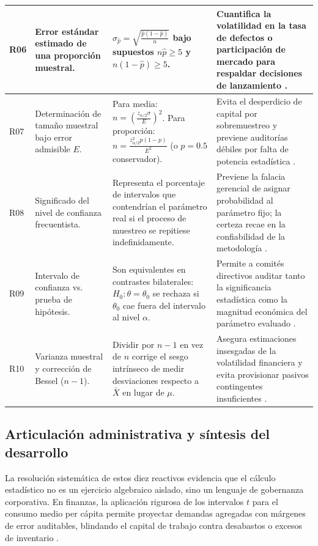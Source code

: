 {\begin{center}
\begin{longtable}{p{1.1cm}p{4.2cm}p{4.3cm}p{4.8cm}}
\midrule
R06 & Error estándar estimado de una proporción muestral. & $\sigma_{\hat{p}} = \sqrt{\frac{\hat{p}(1-\hat{p})}{n}}$ bajo supuestos $n\hat{p} \ge 5$ y $n(1-\hat{p}) \ge 5$. & Cuantifica la volatilidad en la tasa de defectos o participación de mercado para respaldar decisiones de lanzamiento \citep{anderson2012}. \\
\midrule
R07 & Determinación de tamaño muestral bajo error admisible $E$. & Para media: $n = \left(\frac{z_{\alpha/2}\sigma}{E}\right)^2$. Para proporción: $n = \frac{z_{\alpha/2}^2 p(1-p)}{E^2}$ (o $p=0.5$ conservador). & Evita el desperdicio de capital por sobremuestreo y previene auditorías débiles por falta de potencia estadística \citep{lind2012}. \\
\midrule
R08 & Significado del nivel de confianza frecuentista. & Representa el porcentaje de intervalos que contendrían el parámetro real si el proceso de muestreo se repitiese indefinidamente. & Previene la falacia gerencial de asignar probabilidad al parámetro fijo; la certeza recae en la confiabilidad de la metodología \citep{nistHandbook}. \\
\midrule
R09 & Intervalo de confianza vs. prueba de hipótesis. & Son equivalentes en contrastes bilaterales: $H_0: \theta = \theta_0$ se rechaza si $\theta_0$ cae fuera del intervalo al nivel $\alpha$. & Permite a comités directivos auditar tanto la significancia estadística como la magnitud económica del parámetro evaluado \citep{wackerly2010}. \\
\midrule
R10 & Varianza muestral y corrección de Bessel ($n-1$). & Dividir por $n-1$ en vez de $n$ corrige el sesgo intrínseco de medir desviaciones respecto a $\bar{X}$ en lugar de $\mu$. & Asegura estimaciones insesgadas de la volatilidad financiera y evita provisionar pasivos contingentes insuficientes \citep{holmesBusiness2023}. \\
\end{longtable}
\end{center}

\subsection{Articulación administrativa y síntesis del desarrollo}
La resolución sistemática de estos diez reactivos evidencia que el cálculo estadístico no es un ejercicio algebraico aislado, sino un lenguaje de gobernanza corporativa. En finanzas, la aplicación rigurosa de los intervalos $t$ para el consumo medio per cápita permite proyectar demandas agregadas con márgenes de error auditables, blindando el capital de trabajo contra desabastos o excesos de inventario \citep{anderson2012}. 

}
